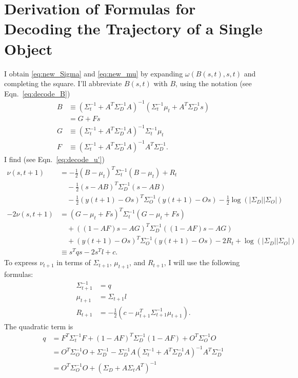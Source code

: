 \documentclass[11pt]{article}
\newcommand{\ti}[2]{{#1}{(#2)}}                         %
\newcommand{\logdet}{\log\left(\left|\Sigma_D\right| \left| \Sigma_O
    \right| \right)}
\begin{document}
\section{Derivation of Formulas for Decoding the Trajectory of a Single Object}
\label{app:decode}

I obtain \eqref{eq:new_Sigma} and \eqref{eq:new_mu} by expanding
$\omega(B(s,t),s,t)$ and completing the square.  I'll abbreviate $B(s,t)$
with $B$, using the notation (see Eqn.~\eqref{eq:decode_B})
\begin{align*}
  B &\equiv \left( \Sigma_t^{-1} + A^T \Sigma_D^{-1} A \right)^{-1}
  \left( \Sigma_t^{-1} \mu_t + A^T \Sigma_D^{-1} s \right) \\
  &= G + Fs \\
  G &\equiv \left( \Sigma_t^{-1} + A^T \Sigma_D^{-1} A \right)^{-1}
  \Sigma_t^{-1} \mu_t \\
  F &\equiv  \left( \Sigma_t^{-1} + A^T \Sigma_D^{-1} A \right)^{-1}
  A^T \Sigma_D^{-1}.
\end{align*}
I find (see Eqn.~\eqref{eq:decode_u'})
\begin{align*}
  \nu(s,t+1) &= -\frac{1}{2}(B-\mu_{t})^T \Sigma_{t}^{-1}
  (B-\mu_{t}) + R_t\\
  &\quad - \frac{1}{2} (s-AB)^T \Sigma_{D}^{-1} (s-AB)\\
  &\quad - \frac{1}{2}(\ti{y}{t+1}-O s)^T \Sigma_{O}^{-1}
  (\ti{y}{t+1}-Os) -\frac{1}{2} \logdet\\
  -2 \nu(s,t+1) &= (G-\mu_{t}+Fs)^T \Sigma_{t}^{-1} (G-\mu_{t}+Fs) \\
  &\quad + ((1-AF)s-AG)^T \Sigma_{D}^{-1} ((1-AF)s-AG)\\
  &\quad + (\ti{y}{t+1}-O s)^T \Sigma_{O}^{-1} (\ti{y}{t+1}-Os) -2R_t + \logdet \\
  &\equiv s^T q s - 2s^T l + c.
\end{align*}
To express $\nu_{t+1}$ in terms of $\Sigma_{t+1}$, $\mu_{t+1}$, and
$R_{t+1}$, I will use the following formulas:
\begin{align*}
  \Sigma_{t+1}^{-1} &= q \\
  \mu_{t+1} &= \Sigma_{t+1} l \\
  R_{t+1} &= -\frac{1}{2} \left( c - \mu_{t+1}^T \Sigma_{t+1}^{-1}
    \mu_{t+1} \right) .
\end{align*}
The quadratic term is
\begin{align*}
  q &= F^T\Sigma_t^{-1}F + (1-AF)^T\Sigma_D^{-1}(1-AF) +
  O^T\Sigma_O^{-1}O \\
  &= O^T\Sigma_O^{-1}O + \Sigma_D^{-1} - \Sigma_D^{-1}A
  ( \Sigma_t^{-1} + A^T\Sigma_D^{-1}A )^{-1}A^T\Sigma_D^{-1}\\
  &= O^T\Sigma_O^{-1}O + (\Sigma_D + A \Sigma_t A^T)^{-1}
\end{align*}
\end{document}
